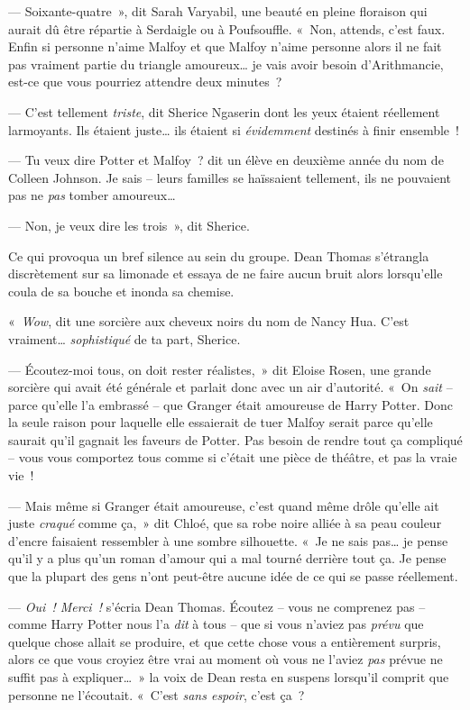 --- Soixante-quatre~», dit Sarah Varyabil, une beauté en pleine floraison qui aurait dû être répartie à Serdaigle ou à Poufsouffle.
«~Non, attends, c'est faux.
Enfin si personne n'aime Malfoy et que Malfoy n'aime personne alors il ne fait pas vraiment partie du triangle amoureux… je vais avoir besoin d'Arithmancie, est-ce que vous pourriez attendre deux minutes~?

--- C'est tellement \emph{triste}, dit Sherice Ngaserin dont les yeux étaient réellement larmoyants.
Ils étaient juste… ils étaient si \emph{évidemment} destinés à finir ensemble~!

--- Tu veux dire Potter et Malfoy~? dit un élève en deuxième année du nom de Colleen Johnson.
Je sais -- leurs familles se haïssaient tellement, ils ne pouvaient pas ne \emph{pas} tomber amoureux…

--- Non, je veux dire les trois~», dit Sherice.

Ce qui provoqua un bref silence au sein du groupe.
Dean Thomas s'étrangla discrètement sur sa limonade et essaya de ne faire aucun bruit alors lorsqu'elle coula de sa bouche et inonda sa chemise.

«~\emph{Wow}, dit une sorcière aux cheveux noirs du nom de Nancy Hua.
C'est vraiment…
\emph{sophistiqué} de ta part, Sherice.

--- Écoutez-moi tous, on doit rester réalistes,~» dit Eloise Rosen, une grande sorcière qui avait été générale et parlait donc avec un air d'autorité.
«~On \emph{sait} -- parce qu'elle l'a embrassé -- que Granger était amoureuse de Harry Potter.
Donc la seule raison pour laquelle elle essaierait de tuer Malfoy serait parce qu'elle saurait qu'il gagnait les faveurs de Potter.
Pas besoin de rendre tout ça compliqué -- vous vous comportez tous comme si c'était une pièce de théâtre, et pas la vraie vie~!

--- Mais même si Granger était amoureuse, c'est quand même drôle qu'elle ait juste \emph{craqué} comme ça,~» dit Chloé, que sa robe noire alliée à sa peau couleur d'encre faisaient ressembler à une sombre silhouette.
«~Je ne sais pas… je pense qu'il y a plus qu'un roman d'amour qui a mal tourné derrière tout ça.
Je pense que la plupart des gens n'ont peut-être aucune idée de ce qui se passe réellement.

--- \emph{Oui~!
Merci~!} s'écria Dean Thomas.
Écoutez -- vous ne comprenez pas -- comme Harry Potter nous l'a \emph{dit} à tous -- que si vous n'aviez pas \emph{prévu} que quelque chose allait se produire, et que cette chose vous a entièrement surpris, alors ce que vous croyiez être vrai au moment où vous ne l'aviez \emph{pas} prévue ne suffit pas à expliquer…~»
la voix de Dean resta en suspens lorsqu'il comprit que personne ne l'écoutait.
«~C'est \emph{sans espoir}, c'est ça~?

